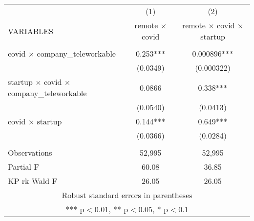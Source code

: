 \begin{tabular}{lcc} \hline
 & (1) & (2) \\
VARIABLES & remote $\times$ covid & remote $\times$ covid $\times$ startup \\ \hline
 &  &  \\
covid $\times$ company\_teleworkable & 0.253*** & 0.000896*** \\
 & (0.0349) & (0.000322) \\
startup $\times$ covid $\times$ company\_teleworkable & 0.0866 & 0.338*** \\
 & (0.0540) & (0.0413) \\
covid $\times$ startup & 0.144*** & 0.649*** \\
 & (0.0366) & (0.0284) \\
 &  &  \\
Observations & 52,995 & 52,995 \\
Partial F & 60.08 & 36.85 \\
 KP rk Wald F & 26.05 & 26.05 \\ \hline
\multicolumn{3}{c}{ Robust standard errors in parentheses} \\
\multicolumn{3}{c}{ *** p$<$0.01, ** p$<$0.05, * p$<$0.1} \\
\end{tabular}
